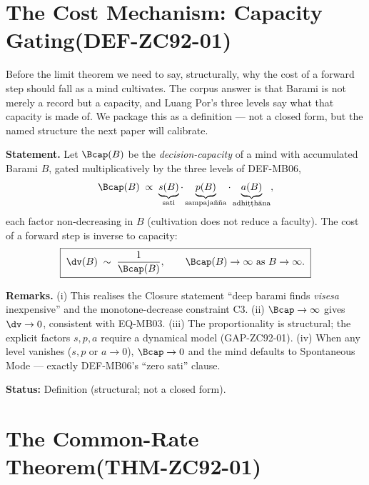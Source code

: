 \documentclass[12pt, a4paper]{article}
\begin{document}
\section{The Cost Mechanism: Capacity Gating\quad(DEF-ZC92-01)}
\label{sec:def-zc92}

Before the limit theorem we need to say, structurally, why the cost of a
forward step should fall as a mind cultivates. The corpus answer is that
Barami is not merely a record but a capacity, and Luang Por's three levels
say what that capacity is made of. We package this as a definition --- not
a closed form, but the named structure the next paper will calibrate.

\begin{formalbox}[title={DEF-ZC92-01: Capacity Functional and Cost Law
  ($R_0$, Definition)}]

\textbf{Statement.} Let $\Bcap(B)$ be the \emph{decision-capacity} of a
mind with accumulated Barami $B$, gated multiplicatively by the three
levels of DEF-MB06,
\[
  \Bcap(B)\;\propto\;
  \underbrace{s(B)}_{\text{sati}}\cdot
  \underbrace{p(B)}_{\text{sampajañña}}\cdot
  \underbrace{a(B)}_{\text{adhiṭṭhāna}},
\]
each factor non-decreasing in $B$ (cultivation does not reduce a
faculty). The cost of a forward step is inverse to capacity:
\begin{equation}
  \boxed{\;\dv(B)\;\sim\;\frac{1}{\Bcap(B)},\qquad
  \Bcap(B)\to\infty\ \text{as}\ B\to\infty.\;}
  \label{eq:costlaw-zc92}
\end{equation}

\textbf{Remarks.} (i) This realises the Closure statement ``deep barami
finds \emph{visesa} inexpensive'' and the monotone-decrease constraint
C3. (ii) $\Bcap\to\infty$ gives $\dv\to0$, consistent with EQ-MB03. (iii)
The proportionality is structural; the explicit factors $s,p,a$ require a
dynamical model (GAP-ZC92-01). (iv) When any level vanishes ($s,p$ or
$a\to0$), $\Bcap\to0$ and the mind defaults to Spontaneous Mode ---
exactly DEF-MB06's ``zero sati'' clause.

\textbf{Status:} Definition (structural; not a closed form).
\end{formalbox}

\section{The Common-Rate Theorem\quad(THM-ZC92-01)}
\label{sec:thm-zc92}
\end{document}
